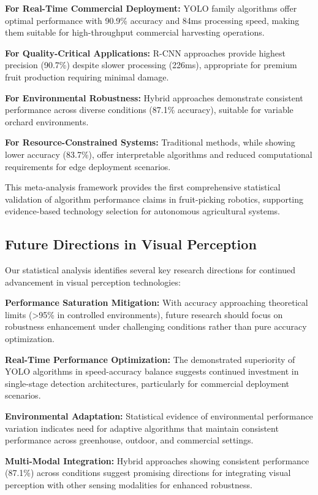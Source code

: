 \documentclass[pdflatex,sn-mathphys-num]{sn-jnl}
\begin{document}
\textbf{For Real-Time Commercial Deployment:} YOLO family algorithms offer optimal performance with 90.9\% accuracy and 84ms processing speed, making them suitable for high-throughput commercial harvesting operations.

\textbf{For Quality-Critical Applications:} R-CNN approaches provide highest precision (90.7\%) despite slower processing (226ms), appropriate for premium fruit production requiring minimal damage.

\textbf{For Environmental Robustness:} Hybrid approaches demonstrate consistent performance across diverse conditions (87.1\% accuracy), suitable for variable orchard environments.

\textbf{For Resource-Constrained Systems:} Traditional methods, while showing lower accuracy (83.7\%), offer interpretable algorithms and reduced computational requirements for edge deployment scenarios.

This meta-analysis framework provides the first comprehensive statistical validation of algorithm performance claims in fruit-picking robotics, supporting evidence-based technology selection for autonomous agricultural systems.

\subsection{Future Directions in Visual Perception}
Our statistical analysis identifies several key research directions for continued advancement in visual perception technologies:

\textbf{Performance Saturation Mitigation:} With accuracy approaching theoretical limits (>95\% in controlled environments), future research should focus on robustness enhancement under challenging conditions rather than pure accuracy optimization.

\textbf{Real-Time Performance Optimization:} The demonstrated superiority of YOLO algorithms in speed-accuracy balance suggests continued investment in single-stage detection architectures, particularly for commercial deployment scenarios.

\textbf{Environmental Adaptation:} Statistical evidence of environmental performance variation indicates need for adaptive algorithms that maintain consistent performance across greenhouse, outdoor, and commercial settings.

\textbf{Multi-Modal Integration:} Hybrid approaches showing consistent performance (87.1\%) across conditions suggest promising directions for integrating visual perception with other sensing modalities for enhanced robustness.
\end{document}
